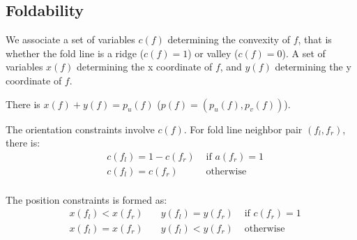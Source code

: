 \subsection{Foldability}
We associate a set of variables $c(f)$ determining the convexity of $f$, that is whether the fold line is a ridge ($c(f) = 1$) or valley ($c(f) = 0$). A set of variables $x(f)$ determining the x coordinate of $f$, and $y(f)$ determining the y coordinate of $f$.

There is $x(f) + y(f) = p_u(f)$ ($p(f) = (p_u(f), p_v(f))$).

The orientation constraints involve $c(f)$. For fold line neighbor pair $(f_l, f_r)$, there is:
\begin{equation}
  \begin{aligned}
    & c(f_l) = 1 - c(f_r) & \text{ if } a(f_r) = 1 \\
    & c(f_l) = c(f_r) & \text{ otherwise } \\
  \end{aligned}
\end{equation}

The position constraints is formed as:
\begin{equation}
  \begin{aligned}
    & x(f_l) < x(f_r) \quad & y(f_l) = y(f_r) & \text{ if } c(f_r) = 1 \\
    & x(f_l) = x(f_r) \quad & y(f_l) < y(f_r) & \text{ otherwise } \\
  \end{aligned}
\end{equation}
